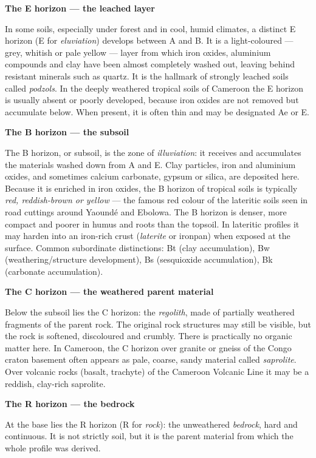 \documentclass[11pt]{article}
\newcommand{\cle}[1]{{\popxbold\color{popdark}#1}}
\begin{document}
\textbf{The E horizon --- the leached layer}\par
In some soils, especially under forest and in cool, humid climates, a distinct \cle{E horizon} (E for \emph{eluviation}) develops between A and B. It is a light-coloured --- grey, whitish or pale yellow --- layer from which iron oxides, aluminium compounds and clay have been almost completely washed out, leaving behind resistant minerals such as quartz. It is the hallmark of strongly leached soils called \emph{podzols}. In the deeply weathered tropical soils of Cameroon the E horizon is usually absent or poorly developed, because iron oxides are not removed but accumulate below. When present, it is often thin and may be designated Ae or E.

\textbf{The B horizon --- the subsoil}\par
The \cle{B horizon}, or \cle{subsoil}, is the zone of \emph{illuviation}: it receives and accumulates the materials washed down from A and E. Clay particles, iron and aluminium oxides, and sometimes calcium carbonate, gypsum or silica, are deposited here. Because it is enriched in iron oxides, the B horizon of tropical soils is typically \emph{red, reddish-brown or yellow} --- the famous red colour of the lateritic soils seen in road cuttings around Yaoundé and Ebolowa. The B horizon is denser, more compact and poorer in humus and roots than the topsoil. In lateritic profiles it may harden into an iron-rich crust (\emph{laterite} or ironpan) when exposed at the surface. Common subordinate distinctions: Bt (clay accumulation), Bw (weathering/structure development), Bs (sesquioxide accumulation), Bk (carbonate accumulation).

\textbf{The C horizon --- the weathered parent material}\par
Below the subsoil lies the \cle{C horizon}: the \emph{regolith}, made of partially weathered fragments of the parent rock. The original rock structures may still be visible, but the rock is softened, discoloured and crumbly. There is practically no organic matter here. In Cameroon, the C horizon over granite or gneiss of the Congo craton basement often appears as pale, coarse, sandy material called \emph{saprolite}. Over volcanic rocks (basalt, trachyte) of the Cameroon Volcanic Line it may be a reddish, clay-rich saprolite.

\textbf{The R horizon --- the bedrock}\par
At the base lies the \cle{R horizon} (R for \emph{rock}): the unweathered \emph{bedrock}, hard and continuous. It is not strictly soil, but it is the parent material from which the whole profile was derived.
\end{document}

